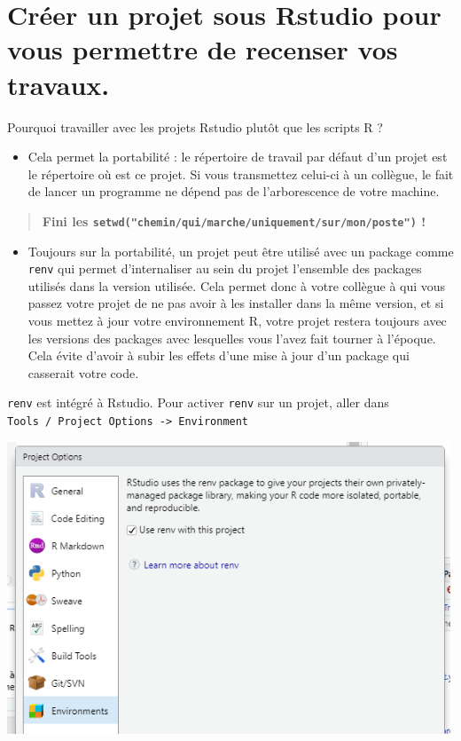 \documentclass[
]{book}
\providecommand{\tightlist}{%
  \setlength{\itemsep}{0pt}\setlength{\parskip}{0pt}}
\begin{document}
\hypertarget{cruxe9er-un-projet-sous-rstudio-pour-vous-permettre-de-recenser-vos-travaux.}{%
\section{Créer un projet sous Rstudio pour vous permettre de recenser vos travaux.}\label{cruxe9er-un-projet-sous-rstudio-pour-vous-permettre-de-recenser-vos-travaux.}}

Pourquoi travailler avec les projets Rstudio plutôt que les scripts R ?

\begin{itemize}
\tightlist
\item
  Cela permet la portabilité : le répertoire de travail par défaut d'un projet est le répertoire où est ce projet. Si vous transmettez celui-ci à un collègue, le fait de lancer un programme ne dépend pas de l'arborescence de votre machine.
\end{itemize}

\begin{quote}
\textbf{Fini les \texttt{setwd("chemin/qui/marche/uniquement/sur/mon/poste")} !}
\end{quote}

\begin{itemize}
\tightlist
\item
  Toujours sur la portabilité, un projet peut être utilisé avec un package comme \texttt{renv} qui permet d'internaliser au sein du projet l'ensemble des packages utilisés dans la version utilisée. Cela permet donc à votre collègue à qui vous passez votre projet de ne pas avoir à les installer dans la même version, et si vous mettez à jour votre environnement R, votre projet restera toujours avec les versions des packages avec lesquelles vous l'avez fait tourner à l'époque. Cela évite d'avoir à subir les effets d'une mise à jour d'un package qui casserait votre code.
\end{itemize}

\texttt{renv} est intégré à Rstudio. Pour activer \texttt{renv} sur un projet, aller dans \texttt{Tools\ /\ Project\ Options\ -\textgreater{}\ Environment}

\includegraphics[width=5.20833in,height=\textheight]{pic/creerprojet4.png}
\end{document}
